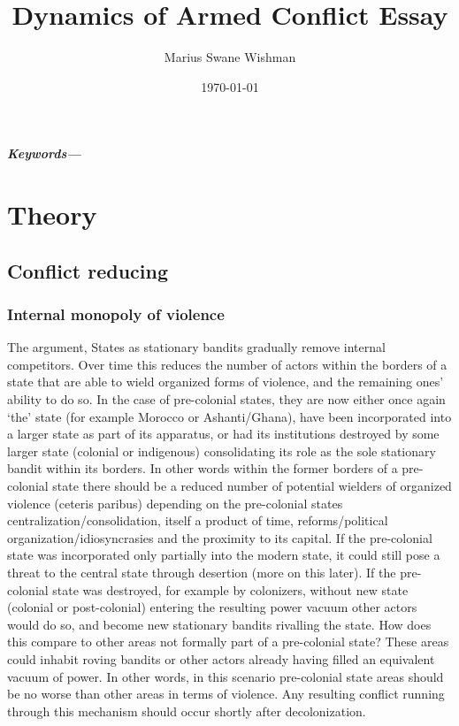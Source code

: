 \documentclass[12pt]{article}
\title{Dynamics of Armed Conflict Essay}
\author[1]{Marius Swane Wishman}
\affil[1]{Department of Sociology and Political Science, NTNU}
\date{\today}
\providecommand{\keywords}[1]
{
	\small	
	\textbf{\textit{Keywords---}} #1
}
\begin{document}
\maketitle

\begin{abstract}

\end{abstract}

\keywords{}

\pagebreak


\onehalfspacing

\section{Theory}

\subsection{Conflict reducing}

\subsubsection{Internal monopoly of violence}

The \citet{Tilly1990} argument, 
States as stationary bandits gradually remove internal
competitors. Over time this reduces the number of actors within the borders of a
state that are able to wield organized forms of violence, and the remaining
ones' ability to do so. In the case of pre-colonial states, they are now either
once again `the' state (for example Morocco or Ashanti/Ghana), have been
incorporated into a larger state as part of its apparatus, or had its
institutions destroyed by some larger state (colonial or indigenous)
consolidating its role as the sole stationary bandit within its borders. In
other words within the former borders of a pre-colonial state there should be a
reduced number of potential wielders of organized violence (ceteris paribus)
depending on the pre-colonial states centralization/consolidation, itself a
product of time, reforms/political organization/idiosyncrasies and the proximity
to its capital. If the pre-colonial state was incorporated only partially into
the modern state, it could still pose a threat to the central state through
desertion (more on this later). If the pre-colonial state was destroyed, for
example by colonizers, without new state (colonial or post-colonial) entering
the resulting power vacuum other actors would do so, and become new stationary
bandits rivalling the state. How does this compare to other areas not formally
part of a pre-colonial state? These areas could inhabit roving bandits
\citep{Scott2009} or other actors already having filled an equivalent vacuum of
power. In other words, in this scenario pre-colonial state areas should be no
worse than other areas in terms of violence. Any resulting conflict running
through this mechanism should occur shortly after decolonization.
\end{document}
